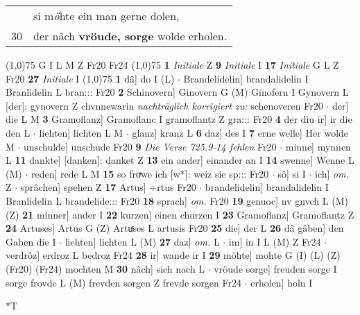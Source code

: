 \documentclass[8pt,a4paper,notitlepage]{article}
\begin{document}
\begin{table}[ht]
\begin{minipage}[t]{0.5\linewidth}
\begin{tabular}{rl}
 & si m\textit{ö}hte ein man gerne dolen,\\ 
30 & der nâch \textbf{vröude, sorge} wolde erholen.\\ 
\end{tabular}
\scriptsize
\line(1,0){75} \newline
G I L M Z Fr20 Fr24 \newline
\line(1,0){75} \newline
\textbf{1} \textit{Initiale} Z  \textbf{9} \textit{Initiale} I  \textbf{17} \textit{Initiale} G L Z Fr20  \textbf{27} \textit{Initiale} I  \newline
\line(1,0){75} \newline
\textbf{1} dâ] do I (L)  $\cdot$ Brandelidelin] brandalidelin I Branlidelin L bran::: Fr20 \textbf{2} Schinovern] Ginovern G (M) Ginofern I Gynovern L [der]: gynovern Z chvnnewarin \textit{nachträglich korrigiert zu:} schenoveren Fr20  $\cdot$ der] die L M \textbf{3} Gramoflanz] Gramoflanc I gramoflantz Z gra::: Fr20 \textbf{4} der diu ir] ir die den L  $\cdot$ liehten] lichten L M  $\cdot$ glanz] kranz L \textbf{6} daz] des I \textbf{7} erne welle] Her wolde M  $\cdot$ unschulde] unschude Fr20 \textbf{9} \textit{Die Verse 725.9-14 fehlen} Fr20   $\cdot$ minne] mynnen L \textbf{11} dankte] [danken]: danket Z \textbf{13} ein ander] einander an I \textbf{14} swenne] Wenne L (M)  $\cdot$ reden] rede L M \textbf{15} so froͮwe ich [w*]: weiz sie sp::: Fr20  $\cdot$ sô] si I  $\cdot$ ich] \textit{om.} Z  $\cdot$ sprâchen] spehen Z \textbf{17} Artus] ÷rtus Fr20  $\cdot$ brandelidelin] brandalidelin I Branlidelin L brandelide::: Fr20 \textbf{18} sprach] \textit{om.} Fr20 \textbf{19} genuoc] nv gnvch L (M) (Z) \textbf{21} minner] ander I \textbf{22} kurzen] einen churzen I \textbf{23} Gramoflanz] Gramoflantz Z \textbf{24} Artuses] Artus G (Z) Artuͯses L artusis Fr20 \textbf{25} die] der L \textbf{26} dâ gâben] den Gaben die I  $\cdot$ liehten] lichten L (M) \textbf{27} daz] \textit{om.} L  $\cdot$ im] in I L (M) Z Fr24  $\cdot$ verdrôz] erdroz L bedroz Fr24 \textbf{28} ir] wande ir I \textbf{29} möhte] mohte G (I) (L) (Z) (Fr20) (Fr24) mochten M \textbf{30} nâch] sich nach L  $\cdot$ vröude sorge] freuden sorge I sorge frovde L (M) frevden sorgen Z frevde sorgen Fr24  $\cdot$ erholen] holn I \newline
\end{minipage}
\hspace{0.5cm}
\begin{minipage}[t]{0.5\linewidth}
\small
\begin{center}*T

\end{center}
\end{minipage}
\end{table}
\end{document}
